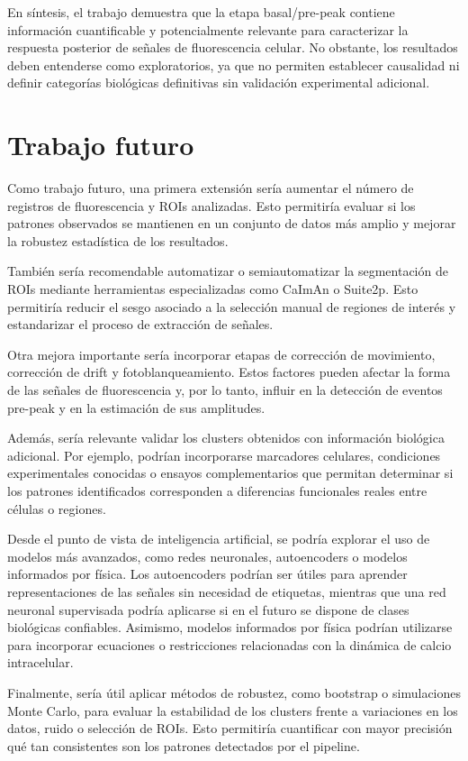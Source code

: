 \documentclass[10pt,twocolumn]{article}
\begin{document}
En síntesis, el trabajo demuestra que la etapa basal/pre-peak contiene información cuantificable y potencialmente relevante para caracterizar la respuesta posterior de señales de fluorescencia celular. No obstante, los resultados deben entenderse como exploratorios, ya que no permiten establecer causalidad ni definir categorías biológicas definitivas sin validación experimental adicional.

\section{Trabajo futuro}

Como trabajo futuro, una primera extensión sería aumentar el número de registros de fluorescencia y ROIs analizadas. Esto permitiría evaluar si los patrones observados se mantienen en un conjunto de datos más amplio y mejorar la robustez estadística de los resultados.

También sería recomendable automatizar o semiautomatizar la segmentación de ROIs mediante herramientas especializadas como CaImAn o Suite2p. Esto permitiría reducir el sesgo asociado a la selección manual de regiones de interés y estandarizar el proceso de extracción de señales.

Otra mejora importante sería incorporar etapas de corrección de movimiento, corrección de drift y fotoblanqueamiento. Estos factores pueden afectar la forma de las señales de fluorescencia y, por lo tanto, influir en la detección de eventos pre-peak y en la estimación de sus amplitudes.

Además, sería relevante validar los clusters obtenidos con información biológica adicional. Por ejemplo, podrían incorporarse marcadores celulares, condiciones experimentales conocidas o ensayos complementarios que permitan determinar si los patrones identificados corresponden a diferencias funcionales reales entre células o regiones.

Desde el punto de vista de inteligencia artificial, se podría explorar el uso de modelos más avanzados, como redes neuronales, autoencoders o modelos informados por física. Los autoencoders podrían ser útiles para aprender representaciones de las señales sin necesidad de etiquetas, mientras que una red neuronal supervisada podría aplicarse si en el futuro se dispone de clases biológicas confiables. Asimismo, modelos informados por física podrían utilizarse para incorporar ecuaciones o restricciones relacionadas con la dinámica de calcio intracelular.

Finalmente, sería útil aplicar métodos de robustez, como bootstrap o simulaciones Monte Carlo, para evaluar la estabilidad de los clusters frente a variaciones en los datos, ruido o selección de ROIs. Esto permitiría cuantificar con mayor precisión qué tan consistentes son los patrones detectados por el pipeline.



\end{document}
